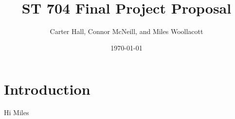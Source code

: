 \documentclass[11pt]{article}   	%
\title{{\bf{ST 704 Final Project Proposal}}}
\author{Carter Hall, Connor McNeill, and Miles Woollacott}
\date{\today}							%
\begin{document}
\maketitle

\section{Introduction}

Hi Miles
\end{document}
